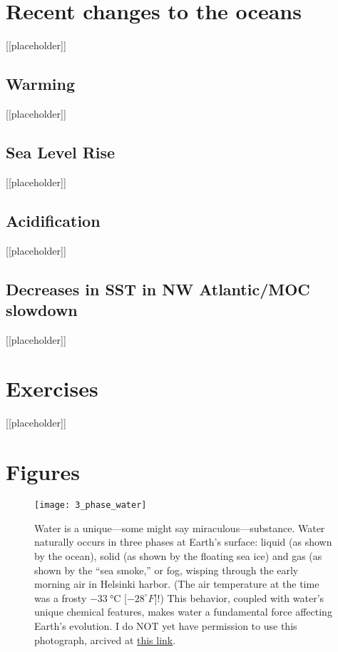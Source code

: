 {\section{Recent changes to the oceans} \label{Climate change in the Oceans}
[[placeholder]]
\subsection{Warming}
[[placeholder]]
\subsection{Sea Level Rise}
[[placeholder]]
\subsection{Acidification}
[[placeholder]]
\subsection{Decreases in SST in NW Atlantic/MOC slowdown}
[[placeholder]]

\section{Exercises} \label{Hydrosphere_Exercises}

[[placeholder]]
 

%
\section{Figures} \label{Hydrosphere_Figures}

\newpage
\begin{figure}[p]
\centering
  \texttt{[image: 3\_phase\_water]}%
\caption{Water is a unique---some might say miraculous---substance. Water naturally occurs in three phases at Earth's surface: liquid (as shown by the ocean), solid (as shown by the floating sea ice) and gas (as shown by the ``sea smoke,'' or fog, wisping through the early morning air in Helsinki harbor. (The air temperature at the time was a frosty $\SI{-33}{\degreeCelsius}$ [$-28^{\circ} F$]!) This behavior, coupled with water's unique chemical features, makes water a fundamental force affecting Earth's evolution. I do NOT yet have permission to use this photograph, arcived at \href{http://inktank.fi/these-surreal-photo-show-what-its-like-to-sail-through-the-sea-at-minus-28-degrees/}{this link}.}
\label{fig:3_phase_water}
\end{figure}

}

